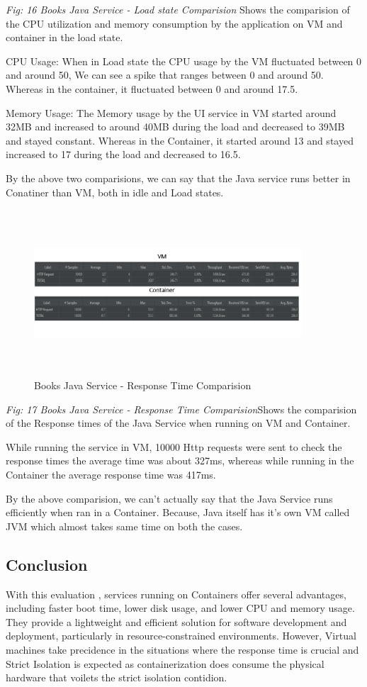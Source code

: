 \emph{Fig: 16 Books Java Service - Load state Comparision} Shows the comparision of the CPU utilization and memory consumption by the application on VM and container in the load state.

CPU Usage: When in Load state the CPU usage by the VM fluctuated between 0 and around 50, We can see a spike that ranges between 0 and around 50. Whereas in the container, it fluctuated between 0 and around 17.5.

Memory Usage:  The Memory usage by the UI service in VM started around 32MB and increased to around 40MB during the load and decreased to 39MB and stayed constant. Whereas in the Container, it started around 13 and stayed increased to 17 during the load and decreased to 16.5.

By the above two comparisions, we can say that the Java service runs better in Conatiner than VM, both in idle and Load states.


\begin{figure}[!h]
    \centering
    \includegraphics[width=10cm, height=6.2cm]{images/book-response-comp.png}
    \caption{Books Java Service - Response Time Comparision}
\end{figure}

\emph{Fig: 17 Books Java Service - Response Time Comparision}Shows the comparision of the Response times of the Java Service when running on VM and Container.

While running the service in VM, 10000 Http requests were sent to check the response times the average time was about 327ms, whereas while running in the Container the average response time was 417ms.

By the above comparision, we can't  actually say that the Java Service runs efficiently when ran in a Container. Because,  Java itself has it's own VM called JVM which almost takes same time on both the cases. 

\subsection{Conclusion}
With this evaluation , services running on Containers offer several advantages, including faster boot time, lower disk usage, and lower CPU and memory usage. They provide a lightweight and efficient solution for software development and deployment, particularly in resource-constrained environments.
However, Virtual machines take precidence in the situations where the response time is crucial and Strict Isolation is expected as containerization does consume the physical hardware that voilets the strict isolation contidion.




